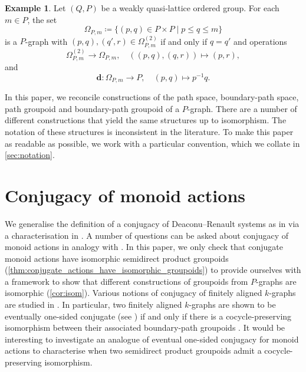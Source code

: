 \documentclass[11pt]{amsart}
\theoremstyle{definition}
\numberwithin{thm}{section}
\numberwithin{equation}{section}
\newtheorem{example}[thm]{Example}
\newcommand{\setof}[2]{\{ #1 \mid #2 \}}
\newcommand{\degree}{\mathbf{d}}
\newcommand{\composablepairs}[1]{#1^{(2)}}
\begin{document}
\begin{example}
\label{ex:path_prototypes_finite}
Let $(Q, P)$ be a weakly quasi-lattice ordered group. 
For each $m \in P$, the set
\[
\Omega_{P, m} \coloneqq 
\setof{
(p, q) \in P \times P
}{
p \leq q \leq m
}
\]
is a $P$-graph with $(p, q), (q', r)\in\composablepairs{\Omega_{P, m}}$ if and only if $q = q'$ and operations
\[
\composablepairs{\Omega_{P, m}} \to \Omega_{P, m}, \quad ((p, q), (q, r)) \mapsto (p, r),
\]
and
\[
\degree \colon \Omega_{P, m} \to P, \quad (p, q) \mapsto p^{-1}q.
\]
\end{example}

In this paper, we reconcile constructions of the path space, boundary-path space, path groupoid and boundary-path groupoid of a $P$-graph. 
There are a number of different constructions that yield the same structures up to isomorphism. 
The notation of these structures is inconsistent in the literature. 
To make this paper as readable as possible, we work with a particular convention, which we collate in \cref{sec:notation}.

\section{Conjugacy of monoid actions}
\label{section:conjugacy}

We generalise the definition of a conjugacy of Deaconu--Renault systems as in \cite{ABCE23} via a characterisation in \cite[Lemma 2.6(2)]{ABCE23}.
A number of questions can be asked about conjugacy of monoid actions in analogy with \cite[Theorem 3.1]{ABCE23}. 
In this paper, we only check that conjugate monoid actions have isomorphic semidirect product groupoids 
(\cref{thm:conjugate_actions_have_isomorphic_groupoids}) to provide ourselves with a framework to show that different constructions of groupoids from $P$-graphs are isomorphic (\cref{cor:isom}).
Various notions of conjugacy of finitely aligned $k$-graphs are studied in \cite{CR2021}. 
In particular, two finitely aligned $k$-graphs are shown to be eventually one-sided conjugate (see \cite[Definition 3.1]{CR2021}) if and only if there is a cocycle-preserving isomorphism between their associated boundary-path groupoids \cite[Theorem 3.2]{CR2021}. 
It would be interesting to investigate an analogue of eventual one-sided conjugacy for monoid actions to characterise when two semidirect product groupoids admit a cocycle-preserving isomorphism.
\end{document}
